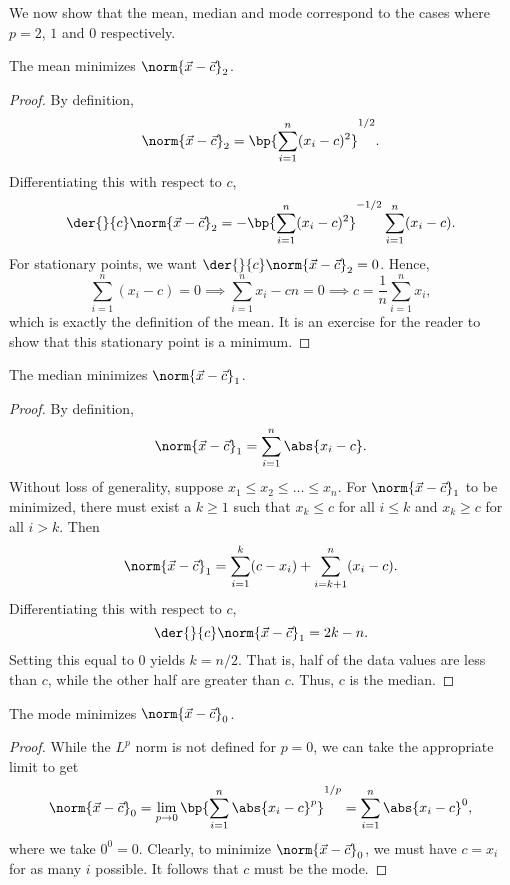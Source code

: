 We now show that the mean, median and mode correspond to the cases where $p = 2$, $1$ and $0$ respectively.

\begin{proposition}
    The mean minimizes $\norm{\vec x - \vec c}_2$.
\end{proposition}
\begin{proof}
    By definition, \[\norm{\vec x - \vec c}_2 = \bp{\sum_{i = 1}^n (x_i - c)^2}^{1/2}.\] Differentiating this with respect to $c$, \[\der{}{c} \norm{\vec x - \vec c}_2 = -\bp{\sum_{i = 1}^n (x_i - c)^2}^{-1/2} \sum_{i = 1}^n (x_i - c).\] For stationary points, we want $\der{}{c} \norm{\vec x - \vec c}_2 = 0$. Hence, \[\sum_{i = 1}^n (x_i - c) = 0 \implies \sum_{i = 1}^n x_i - cn = 0 \implies c = \frac1n \sum_{i = 1}^n x_i,\] which is exactly the definition of the mean. It is an exercise for the reader to show that this stationary point is a minimum.
\end{proof}

\begin{proposition}
    The median minimizes $\norm{\vec x - \vec c}_1$.
\end{proposition}
\begin{proof}
    By definition, \[\norm{\vec x - \vec c}_1 = \sum_{i = 1}^n \abs{x_i - c}.\] Without loss of generality, suppose $x_1 \leq x_2 \leq \dots \leq x_n$. For $\norm{\vec x - \vec c}_1$ to be minimized, there must exist a $k \geq 1$ such that $x_k \leq c$ for all $i \leq k$ and $x_k \geq c$ for all $i > k$. Then \[\norm{\vec x - \vec c}_1 = \sum_{i = 1}^{k} (c - x_i) + \sum_{i = k+1}^n (x_i - c).\] Differentiating this with respect to $c$, \[\der{}{c} \norm{\vec x - \vec c}_1 = 2k - n.\] Setting this equal to 0 yields $k = n/2$. That is, half of the data values are less than $c$, while the other half are greater than $c$. Thus, $c$ is the median.
\end{proof}

\begin{proposition}
    The mode minimizes $\norm{\vec x - \vec c}_0$.
\end{proposition}
\begin{proof}
    While the $L^p$ norm is not defined for $p = 0$, we can take the appropriate limit to get \[\norm{\vec x - \vec c}_0 = \lim_{p \to 0} \bp{\sum_{i = 1}^n \abs{x_i - c}^p}^{1/p} = \sum_{i = 1}^n \abs{x_i - c}^0,\] where we take $0^0 = 0$. Clearly, to minimize $\norm{\vec x - \vec c}_0$, we must have $c = x_i$ for as many $i$ possible. It follows that $c$ must be the mode.
\end{proof}

